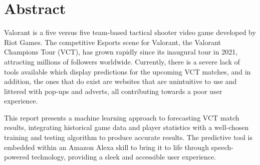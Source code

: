 \chapter*{\Large \centering Abstract}

Valorant is a five versus five team-based tactical shooter video game developed by Riot Games. The competitive Esports scene for Valorant, the Valorant Champions Tour (VCT), has grown rapidly since its inaugural tour in 2021, attracting millions of followers worldwide. Currently, there is a severe lack of tools available which display predictions for the upcoming VCT matches, and in addition, the ones that do exist are websites that are unintuitive to use and littered with pop-ups and adverts, all contributing towards a poor user experience.

This report presents a machine learning approach to forecasting VCT match results, integrating historical game data and player statistics with a well-chosen training and testing algorithm to produce accurate results. The predictive tool is embedded within an Amazon Alexa skill to bring it to life through speech-powered technology, providing a sleek and accessible user experience.
